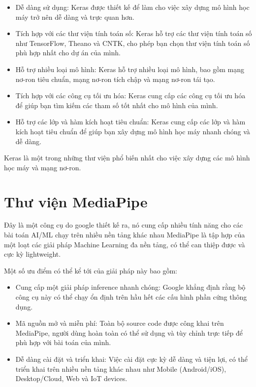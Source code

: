\begin{itemize}
	\item Dễ dàng sử dụng: Keras được thiết kế để làm cho việc xây dựng mô hình học máy trở nên dễ dàng và trực quan hơn.
	
	\item Tích hợp với các thư viện tính toán số: Keras hỗ trợ các thư viện tính toán số như TensorFlow, Theano và CNTK, cho phép bạn chọn thư viện tính toán số phù hợp nhất cho dự án của mình.
	
	\item Hỗ trợ nhiều loại mô hình: Keras hỗ trợ nhiều loại mô hình, bao gồm mạng nơ-ron tiêu chuẩn, mạng nơ-ron tích chập và mạng nơ-ron tái tạo.
	
	\item Tích hợp với các công cụ tối ưu hóa: Keras cung cấp các công cụ tối ưu hóa để giúp bạn tìm kiếm các tham số tốt nhất cho mô hình của mình.
	
	\item Hỗ trợ các lớp và hàm kích hoạt tiêu chuẩn: Keras cung cấp các lớp và hàm kích hoạt tiêu chuẩn để giúp bạn xây dựng mô hình học máy nhanh chóng và dễ dàng.
\end{itemize}

Keras là một trong những thư viện phổ biến nhất cho việc xây dựng các mô hình học máy và mạng nơ-ron. 

\section{Thư viện MediaPipe}

Đây là một công cụ do google thiết kế ra, nó cung cấp nhiều tính năng cho các bài toán AI/ML chạy trên nhiều nền tảng khác nhau MediaPipe là tập hợp của một loạt các giải pháp Machine Learning đa nền tảng, có thể can thiệp được và cực kỳ lightweight.

Một số ưu điểm có thể kể tới của giải pháp này bao gồm:

\begin{itemize}
	\item Cung cấp một giải pháp inference nhanh chóng: Google khẳng định rằng bộ công cụ này có thể chạy ổn định trên hầu hết các cấu hình phần cứng thông dụng.
	
	\item Mã nguồn mở và miễn phí: Toàn bộ source code được công khai trên MediaPipe, người dùng hoàn toàn có thể sử dụng và tùy chỉnh trực tiếp để phù hợp với bài toán của mình.
	
	\item Dễ dàng cài đặt và triển khai: Việc cài đặt cực kỳ dễ dàng và tiện lợi, có thể triển khai trên nhiều nền tảng khác nhau như Mobile (Android/iOS), Desktop/Cloud, Web và IoT devices.
\end{itemize}


